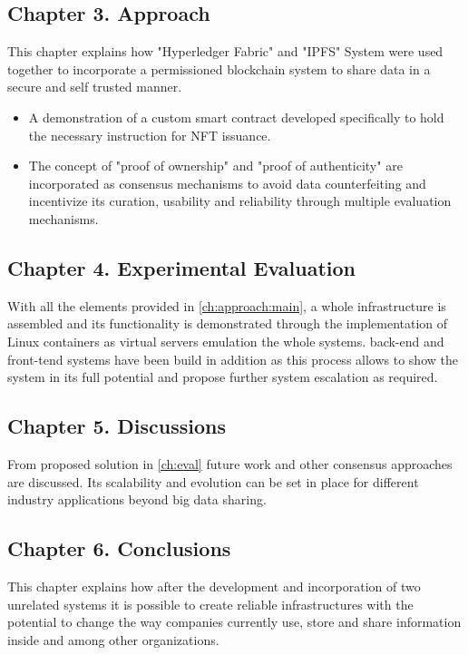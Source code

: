 \subsection{Chapter 3. Approach}
This chapter explains how "Hyperledger Fabric" and "IPFS" System were used together to incorporate a permissioned blockchain system to share data in a secure and self trusted manner. 
\begin{itemize}
    \item A demonstration of a custom smart contract developed specifically to hold the necessary instruction for NFT issuance.
     \item The concept of "proof of ownership" and "proof of authenticity" are incorporated as consensus mechanisms to avoid data counterfeiting and incentivize its curation, usability and reliability through multiple evaluation mechanisms.
\end{itemize}
\subsection{Chapter 4. Experimental Evaluation}
With all the elements provided in \ref{ch:approach:main}, a whole infrastructure is assembled and its functionality is demonstrated through the implementation of Linux containers as virtual servers emulation the whole systems. 
back-end and front-tend systems have been build in addition as this process allows to show the system in its full potential and propose further system escalation as required.
\subsection{Chapter 5. Discussions}
From proposed solution in \ref{ch:eval} future work and other consensus approaches are discussed. Its scalability and evolution can be set in place for different industry applications beyond big data sharing.
\subsection{Chapter 6. Conclusions}
This chapter explains how after the development and incorporation of two unrelated systems it is possible to create reliable infrastructures with the potential to change the way companies currently use, store and share information inside and among other organizations.

